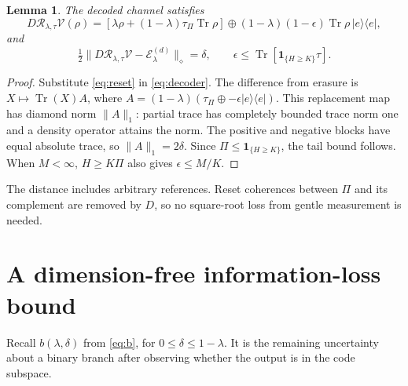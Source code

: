 \documentclass[11pt]{article}
\newtheorem{lemma}[theorem]{Lemma}
\newcommand{\Tr}{\operatorname{Tr}}
\newcommand{\Rcal}{\mathcal R_{\lambda,\tau}}
\begin{document}
\begin{lemma}\label{lem:diamond}
The decoded channel satisfies
\[
 D\Rcal\mathcal V(\rho)=
 [\lambda\rho+(1-\lambda)\tau_\Pi\Tr\rho]
 \oplus(1-\lambda)(1-\epsilon)\Tr\rho\,|e\rangle\langle e|,
\]
and
\begin{equation}\label{eq:diamond}
 \tfrac12\|D\Rcal\mathcal V-\mathcal E_\lambda^{(d)}\|_\diamond
 =\delta,\qquad
 \epsilon\le\Tr[\mathbf1_{\{H\ge K\}}\tau].
\end{equation}
\end{lemma}
\begin{proof}
Substitute \eqref{eq:reset} in \eqref{eq:decoder}. The difference from
erasure is $X\mapsto\Tr(X)A$, where
$A=(1-\lambda)(\tau_\Pi\oplus-\epsilon|e\rangle\langle e|)$.
This replacement map has diamond norm $\|A\|_1$:
partial trace has completely bounded trace norm one and a density
operator attains the norm. The positive and negative blocks have equal
absolute trace, so $\|A\|_1=2\delta$.
Since $\Pi\le\mathbf1_{\{H\ge K\}}$, the tail bound follows.
When $M<\infty$, $H\ge K\Pi$ also gives $\epsilon\le M/K$.
\end{proof}
The distance includes arbitrary references.
Reset coherences between $\Pi$ and its complement are removed by $D$,
so no square-root loss from gentle measurement is needed.

\section{A dimension-free information-loss bound}
Recall $b(\lambda,\delta)$ from \eqref{eq:b}, for
$0\le\delta\le1-\lambda$. It is the remaining uncertainty about a
binary branch after observing whether the output is in the code subspace.
\end{document}
